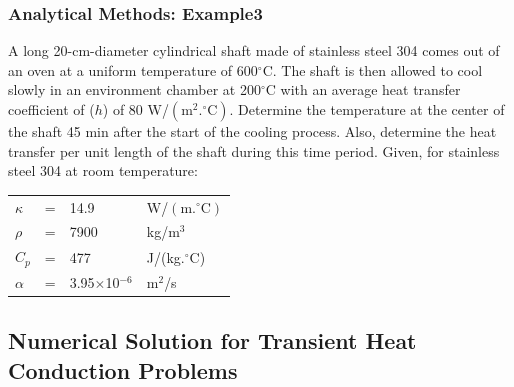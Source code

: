 \documentclass[10pt,compress,unknownkeysallowed]{beamer}
\begin{document}
\begin{frame}
 \frametitle{Analytical Methods: Example3}
A long 20-cm-diameter cylindrical shaft made of stainless steel 304 comes out of an oven at a uniform temperature of 600$^{\circ}$C. The shaft is then allowed to cool slowly in an environment chamber at 200$^{\circ}$C with an average heat transfer coefficient of ($h$) of 80 W/$\left(\text{m}^{2}.^{\circ}\text{C}\right)$. Determine the temperature at the center of the shaft 45 min after the start of the cooling process. Also, determine the heat transfer per unit length of the shaft during this time period. Given, for stainless steel 304 at room temperature: \\
\begin{tabular}{l c l l}
$\kappa$ & = & 14.9 & W/$\left(\text{m.}^{\circ}\text{C}\right)$ \\
$\rho$   & = & 7900 & kg/m$^{3}$ \\
$C_{p}$   & = & 477 & J/(kg.$^{\circ}$C) \\
$\alpha$ & = & 3.95$\times$10$^{-6}$ & m$^{2}$/s 
\end{tabular}

\end{frame}


\subsection{Numerical Solution for Transient Heat Conduction Problems}
\end{document}
